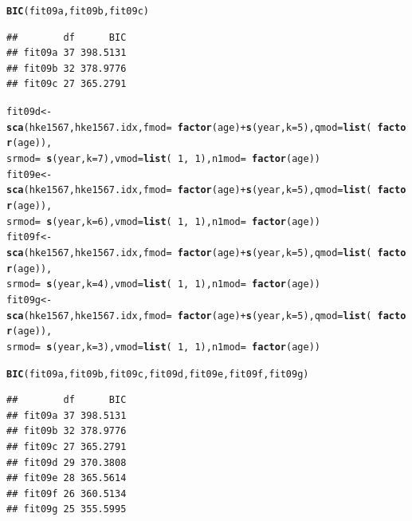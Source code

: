 \documentclass[a4paper,english,11pt]{article}\usepackage[]{graphicx}\usepackage[]{xcolor}
\makeatletter
\newcommand{\hlnum}[1]{\textcolor[rgb]{0.686,0.059,0.569}{#1}}%
\newcommand{\hlopt}[1]{\textcolor[rgb]{0,0,0}{#1}}%
\newcommand{\hldef}[1]{\textcolor[rgb]{0.345,0.345,0.345}{#1}}%
\newcommand{\hlkwb}[1]{\textcolor[rgb]{0.69,0.353,0.396}{#1}}%
\newcommand{\hlkwc}[1]{\textcolor[rgb]{0.333,0.667,0.333}{#1}}%
\newcommand{\hlkwd}[1]{\textcolor[rgb]{0.737,0.353,0.396}{\textbf{#1}}}%
\newenvironment{kframe}{%
 \def\at@end@of@kframe{}%
 \ifinner\ifhmode%
  \def\at@end@of@kframe{\end{minipage}}%
  \begin{minipage}{\columnwidth}%
 \fi\fi%
 \def\FrameCommand##1{\hskip\@totalleftmargin \hskip-\fboxsep
 \colorbox{shadecolor}{##1}\hskip-\fboxsep
     \hskip-\linewidth \hskip-\@totalleftmargin \hskip\columnwidth}%
 \MakeFramed {\advance\hsize-\width
   \@totalleftmargin\z@ \linewidth\hsize
   \@setminipage}}%
 {\par\unskip\endMakeFramed%
 \at@end@of@kframe}
\newenvironment{knitrout}{}{} %
\makeatother
\begin{document}
\begin{knitrout}
\begin{kframe}
\begin{alltt}
\hlkwd{BIC}\hldef{(fit09a, fit09b, fit09c)}
\end{alltt}
\begin{verbatim}
##        df      BIC
## fit09a 37 398.5131
## fit09b 32 378.9776
## fit09c 27 365.2791
\end{verbatim}
\begin{alltt}
\hldef{fit09d} \hlkwb{<-} \hlkwd{sca}\hldef{(hke1567, hke1567.idx,} \hlkwc{fmod} \hldef{=} \hlopt{~}\hlkwd{factor}\hldef{(age)} \hlopt{+} \hlkwd{s}\hldef{(year,} \hlkwc{k} \hldef{=} \hlnum{5}\hldef{),} \hlkwc{qmod} \hldef{=} \hlkwd{list}\hldef{(}\hlopt{~}\hlkwd{factor}\hldef{(age)),}
    \hlkwc{srmod} \hldef{=} \hlopt{~}\hlkwd{s}\hldef{(year,} \hlkwc{k} \hldef{=} \hlnum{7}\hldef{),} \hlkwc{vmod} \hldef{=} \hlkwd{list}\hldef{(}\hlopt{~}\hlnum{1}\hldef{,} \hlopt{~}\hlnum{1}\hldef{),} \hlkwc{n1mod} \hldef{=} \hlopt{~}\hlkwd{factor}\hldef{(age))}
\hldef{fit09e} \hlkwb{<-} \hlkwd{sca}\hldef{(hke1567, hke1567.idx,} \hlkwc{fmod} \hldef{=} \hlopt{~}\hlkwd{factor}\hldef{(age)} \hlopt{+} \hlkwd{s}\hldef{(year,} \hlkwc{k} \hldef{=} \hlnum{5}\hldef{),} \hlkwc{qmod} \hldef{=} \hlkwd{list}\hldef{(}\hlopt{~}\hlkwd{factor}\hldef{(age)),}
    \hlkwc{srmod} \hldef{=} \hlopt{~}\hlkwd{s}\hldef{(year,} \hlkwc{k} \hldef{=} \hlnum{6}\hldef{),} \hlkwc{vmod} \hldef{=} \hlkwd{list}\hldef{(}\hlopt{~}\hlnum{1}\hldef{,} \hlopt{~}\hlnum{1}\hldef{),} \hlkwc{n1mod} \hldef{=} \hlopt{~}\hlkwd{factor}\hldef{(age))}
\hldef{fit09f} \hlkwb{<-} \hlkwd{sca}\hldef{(hke1567, hke1567.idx,} \hlkwc{fmod} \hldef{=} \hlopt{~}\hlkwd{factor}\hldef{(age)} \hlopt{+} \hlkwd{s}\hldef{(year,} \hlkwc{k} \hldef{=} \hlnum{5}\hldef{),} \hlkwc{qmod} \hldef{=} \hlkwd{list}\hldef{(}\hlopt{~}\hlkwd{factor}\hldef{(age)),}
    \hlkwc{srmod} \hldef{=} \hlopt{~}\hlkwd{s}\hldef{(year,} \hlkwc{k} \hldef{=} \hlnum{4}\hldef{),} \hlkwc{vmod} \hldef{=} \hlkwd{list}\hldef{(}\hlopt{~}\hlnum{1}\hldef{,} \hlopt{~}\hlnum{1}\hldef{),} \hlkwc{n1mod} \hldef{=} \hlopt{~}\hlkwd{factor}\hldef{(age))}
\hldef{fit09g} \hlkwb{<-} \hlkwd{sca}\hldef{(hke1567, hke1567.idx,} \hlkwc{fmod} \hldef{=} \hlopt{~}\hlkwd{factor}\hldef{(age)} \hlopt{+} \hlkwd{s}\hldef{(year,} \hlkwc{k} \hldef{=} \hlnum{5}\hldef{),} \hlkwc{qmod} \hldef{=} \hlkwd{list}\hldef{(}\hlopt{~}\hlkwd{factor}\hldef{(age)),}
    \hlkwc{srmod} \hldef{=} \hlopt{~}\hlkwd{s}\hldef{(year,} \hlkwc{k} \hldef{=} \hlnum{3}\hldef{),} \hlkwc{vmod} \hldef{=} \hlkwd{list}\hldef{(}\hlopt{~}\hlnum{1}\hldef{,} \hlopt{~}\hlnum{1}\hldef{),} \hlkwc{n1mod} \hldef{=} \hlopt{~}\hlkwd{factor}\hldef{(age))}

\hlkwd{BIC}\hldef{(fit09a, fit09b, fit09c, fit09d, fit09e, fit09f, fit09g)}
\end{alltt}
\begin{verbatim}
##        df      BIC
## fit09a 37 398.5131
## fit09b 32 378.9776
## fit09c 27 365.2791
## fit09d 29 370.3808
## fit09e 28 365.5614
## fit09f 26 360.5134
## fit09g 25 355.5995
\end{verbatim}
\end{kframe}
\end{knitrout}
\end{document}
